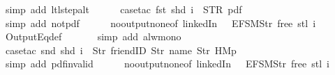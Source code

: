 \begin{isabellebody}
\ {\isacharparenleft}simp\ add{\isacharcolon}\ ltl{\isacharunderscore}step{\isacharunderscore}alt{\isacharparenright}\isanewline
\ \ \ \ \isamarkupfalse%
\ {\isacharparenleft}case{\isacharunderscore}tac\ {\isachardoublequoteopen}{\isacharparenleft}fst\ {\isacharparenleft}shd\ i{\isacharparenright}{\isacharparenright}\ {\isacharequal}\ STR\ {\isacharprime}{\isacharprime}pdf{\isacharprime}{\isacharprime}{\isachardoublequoteclose}{\isacharparenright}\isanewline
\ \ \ \ \ \isamarkupfalse%
\isanewline
\ \ \ \ \ \isamarkupfalse%
\ {\isacharparenleft}simp\ add{\isacharcolon}\ not{\isacharunderscore}pdf{\isacharunderscore}{}{\isacharparenright}\isanewline
\ \ \ \ \isamarkupfalse%
\ no{\isacharunderscore}output{\isacharunderscore}none{\isacharbrackleft}of\ linkedIn\ {\isachardoublequoteopen}{\isacharparenleft}{\isacharless}{\isachargreater}{\isacharparenleft}{}\ {\isacharcolon}{\isacharequal}\ EFSM{\isachardot}Str\ {\isacharprime}{\isacharprime}free{\isacharprime}{\isacharprime}{\isacharparenright}{\isacharparenright}{\isachardoublequoteclose}\ {\isachardoublequoteopen}{\isacharparenleft}stl\ i{\isacharparenright}{\isachardoublequoteclose}{\isacharbrackright}\isanewline
\ \ \ \ \isamarkupfalse%
\ OutputEq{\isacharunderscore}def\isanewline
\ \ \ \ \ \isamarkupfalse%
\ {\isacharparenleft}simp\ add{\isacharcolon}\ alw{\isacharunderscore}mono{\isacharparenright}\isanewline
\ \ \ \ \isamarkupfalse%
\ {\isacharparenleft}case{\isacharunderscore}tac\ {\isachardoublequoteopen}{\isacharparenleft}snd\ {\isacharparenleft}shd\ i{\isacharparenright}{\isacharparenright}\ {\isacharequal}\ {\isacharbrackleft}Str\ {\isacharprime}{\isacharprime}friendID{\isacharprime}{\isacharprime}{\isacharcomma}\ Str\ {\isacharprime}{\isacharprime}name{\isacharprime}{\isacharprime}{\isacharcomma}\ Str\ {\isacharprime}{\isacharprime}HM{}p{\isacharprime}{\isacharprime}{\isacharbrackright}{\isachardoublequoteclose}{\isacharparenright}\isanewline
\ \ \ \ \ \isamarkupfalse%
\isanewline
\ \ \ \ \ \isamarkupfalse%
\ {\isacharparenleft}simp\ add{\isacharcolon}\ pdf{\isacharunderscore}{}{\isacharunderscore}invalid{\isacharparenright}\isanewline
\ \ \ \ \isamarkupfalse%
\ no{\isacharunderscore}output{\isacharunderscore}none{\isacharbrackleft}of\ linkedIn\ {\isachardoublequoteopen}{\isacharparenleft}{\isacharless}{\isachargreater}{\isacharparenleft}{}\ {\isacharcolon}{\isacharequal}\ EFSM{\isachardot}Str\ {\isacharprime}{\isacharprime}free{\isacharprime}{\isacharprime}{\isacharparenright}{\isacharparenright}{\isachardoublequoteclose}\ {\isachardoublequoteopen}{\isacharparenleft}stl\ i{\isacharparenright}{\isachardoublequoteclose}{\isacharbrackright}\isanewline

\end{isabellebody}
